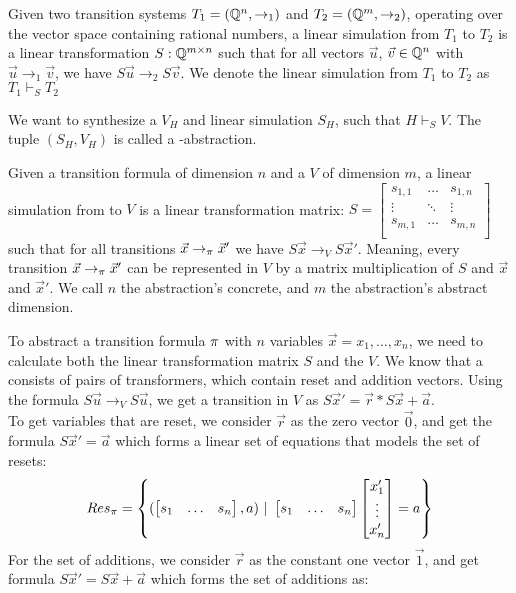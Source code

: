 \begin{mydef}
	Given two transition systems $T_1 = ( \mathbb{Q} ^n, \rightarrow_1)$ and $T_2 = ( \mathbb{Q} ^m, \rightarrow_2)$, operating over the vector space containing rational numbers, a linear simulation from $T_1$ to $T_2$ is a linear transformation $S:  \mathbb{Q} ^{m \times n}$ such that for all vectors $\vec{u}$, $\vec{v} \in  \mathbb{Q} ^n$ with $\vec{u} \rightarrow_1 \vec{v}$, we have $S\vec{u} \rightarrow_2 S\vec{v}$. We denote the linear simulation from $T_1$ to $T_2$ as $T_1 \vdash_S T_2$
\end{mydef}
We want to synthesize a \qvasr $V_H$ and linear simulation $S_H$, such that $H \vdash_S V$. The tuple $(S_H, V_H)$ is called a \qvasr-abstraction.
\begin{mydef}
	Given a transition formula \trf of dimension $n$ and a \qvasr $V$ of dimension $m$, a linear simulation from \trf to $V$ is a linear transformation matrix: 
	$S = 
	\begin{bmatrix}
		s_{1 ,1} & \ldots & s_{1, n} \\
		\vdots & \ddots & \vdots \\
		s_{m ,1} & \ldots & s_{m, n} \\
	\end{bmatrix}$ 
	such that for all transitions $\vec{x} \rightarrow_\pi \vec{x}'$ we have $S\vec{x} \rightarrow_V S\vec{x}'$. Meaning, every transition $\vec{x} \rightarrow_\pi \vec{x}'$ can be represented in $V$ by a matrix multiplication of $S$ and $\vec{x}$ and $\vec{x}'$. We call $n$ the abstraction's concrete, and $m$ the abstraction's abstract dimension. 
\end{mydef}
To abstract a transition formula $\pi$ with $n$ variables $\vec{x} = x_1, \ldots, x_n$, we need to calculate both the linear transformation matrix $S$ and the \qvasr $V$. We know that a \qvasr consists of pairs of transformers, which contain reset and addition vectors. Using the formula $S \vec{u} \rightarrow_V S\vec{u}$, we get a transition in $V$ as $S\vec{x}' = \vec{r}*S\vec{x} + \vec{a}$. \\ To get variables that are reset, we consider $\vec{r}$ as the zero vector $\vec{0}$, and get the formula $S\vec{x}' = \vec{a}$ which forms a linear set of equations that models the set of resets:
\begin{equation*}
	Res_\pi = \left\{ (\begin{bmatrix} s_1 & \ldots &s_n \end{bmatrix}, a)\ |\ \begin{bmatrix} s_1 & \ldots &s_n \end{bmatrix} \begin{bmatrix} x_1' \\ \vdots \\ x_n' \end{bmatrix} = a \right\}	
\end{equation*}
For the set of additions, we consider $\vec{r}$ as the constant one vector $\vec{1}$, and get formula $S\vec{x}' = S\vec{x} + \vec{a}$ which forms the set of additions as:
